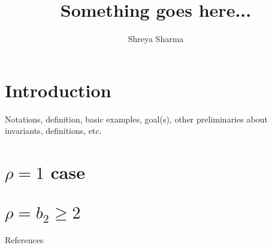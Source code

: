 \documentclass[12pt]{article}
\begin{document}
	\title{\large{Something goes here...}}
	\date{}
	\author{\small{Shreya Sharma}}
	\maketitle
	\tableofcontents
	
	\section{Introduction}
	Notations, definition, basic examples, goal(s), other preliminaries about invariants, definitions, etc.
	\section{$\rho =1$ case}
	\section{$\rho =b_2 \geq 2$}
	References
\end{document}
